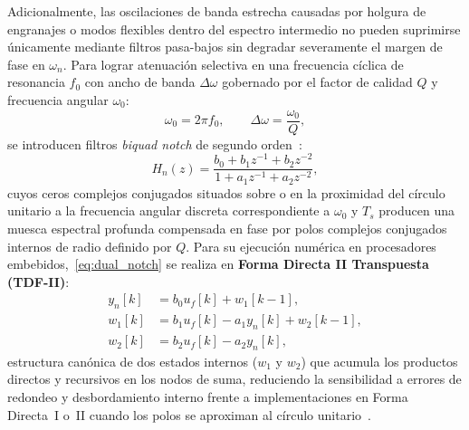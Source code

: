Adicionalmente, las oscilaciones de banda estrecha causadas por holgura de engranajes o modos flexibles dentro del espectro intermedio no pueden suprimirse únicamente mediante filtros pasa-bajos sin degradar severamente el margen de fase en $\omega_n$. Para lograr atenuación selectiva en una frecuencia cíclica de resonancia $f_0$ con ancho de banda $\Delta\omega$ gobernado por el factor de calidad $Q$ y frecuencia angular $\omega_0$:
\begin{equation}
    \omega_0 = 2\pi f_0, \qquad \Delta\omega = \frac{\omega_0}{Q},
    \label{eq:notch_params}
\end{equation}
se introducen filtros \textit{biquad notch} de segundo orden~\cite{Oppenheim2010}:
\begin{equation}
    H_n(z) = \frac{b_0 + b_1 z^{-1} + b_2 z^{-2}}{1 + a_1 z^{-1} + a_2 z^{-2}},
    \label{eq:dual_notch}
\end{equation}
cuyos ceros complejos conjugados situados sobre o en la proximidad del círculo unitario a la frecuencia angular discreta correspondiente a $\omega_0$ y $T_s$ producen una muesca espectral profunda compensada en fase por polos complejos conjugados internos de radio definido por $Q$. Para su ejecución numérica en procesadores embebidos,~\eqref{eq:dual_notch} se realiza en \textbf{Forma Directa II Transpuesta (TDF-II)}:
\begin{equation}
    \begin{aligned}
        y_n[k] &= b_0 u_f[k] + w_1[k-1], \\
        w_1[k] &= b_1 u_f[k] - a_1 y_n[k] + w_2[k-1], \\
        w_2[k] &= b_2 u_f[k] - a_2 y_n[k],
    \end{aligned}
    \label{eq:tdf2_biquad}
\end{equation}
estructura canónica de dos estados internos ($w_1$ y $w_2$) que acumula los productos directos y recursivos en los nodos de suma, reduciendo la sensibilidad a errores de redondeo y desbordamiento interno frente a implementaciones en Forma Directa~I o~II cuando los polos se aproximan al círculo unitario~\cite{Oppenheim2010}.

